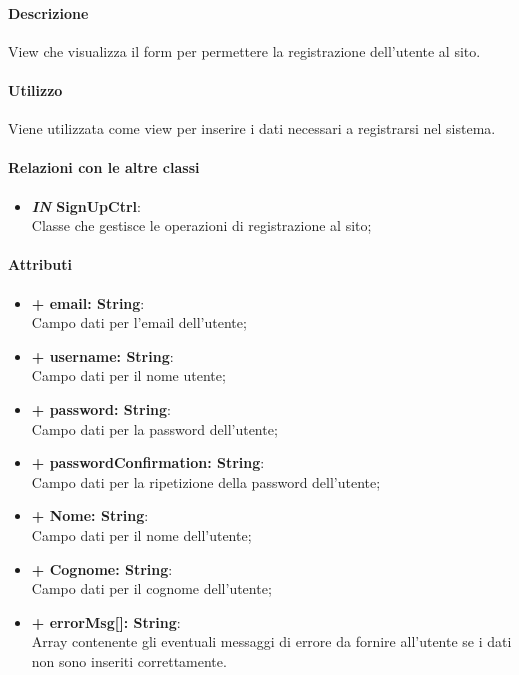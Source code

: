 	\paragraph{Descrizione}
	View che visualizza il form per permettere la registrazione dell'utente al sito.
	
	\paragraph{Utilizzo}
	Viene utilizzata come view per inserire i dati necessari a registrarsi nel sistema.
	
	\paragraph{Relazioni con le altre classi}
	\begin{itemize}
		\item \textbf{\textit{IN} SignUpCtrl}:\\
		Classe che gestisce le operazioni di registrazione al sito;
	\end{itemize}
	
	\paragraph{Attributi}
	\begin{itemize}
		\item \textbf{+ email: String}:\\
			Campo dati per l'email dell'utente;
		\item \textbf{+ username: String}:\\
			Campo dati per il nome utente;
		\item \textbf{+ password: String}:\\
			Campo dati per la password dell'utente;
		\item \textbf{+ passwordConfirmation: String}:\\
			Campo dati per la ripetizione della password dell'utente;
		\item \textbf{+ Nome: String}:\\
			Campo dati per il nome dell'utente;
		\item \textbf{+ Cognome: String}:\\
			Campo dati per il cognome dell'utente;		
		\item \textbf{+ errorMsg[]: String}:\\
			Array contenente gli eventuali messaggi di errore da fornire all'utente se i dati non sono inseriti correttamente.
	\end{itemize}
	

